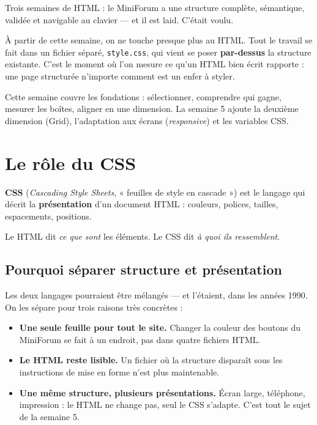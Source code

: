 \documentclass[a4paper,11pt]{article}
\begin{document}
\vspace{4pt}
\begin{tcolorbox}[astuce, title={Où en sommes-nous ?}]
Trois semaines de HTML : le MiniForum a une structure complète, sémantique, validée et navigable au clavier --- et il est laid. C'était voulu.

\vspace{3pt}
À partir de cette semaine, on ne touche presque plus au HTML. Tout le travail se fait dans un fichier séparé, \texttt{style.css}, qui vient se poser \textbf{par-dessus} la structure existante. C'est le moment où l'on mesure ce qu'un HTML bien écrit rapporte : une page structurée n'importe comment est un enfer à styler.

\vspace{3pt}
Cette semaine couvre les fondations : sélectionner, comprendre qui gagne, mesurer les boîtes, aligner en une dimension. La semaine 5 ajoute la deuxième dimension (Grid), l'adaptation aux écrans (\textit{responsive}) et les variables CSS.
\end{tcolorbox}

\section{Le rôle du CSS}

\begin{tcolorbox}[definition, title={Définition --- CSS}]
\textbf{CSS} (\textit{Cascading Style Sheets}, « feuilles de style en cascade ») est le langage qui décrit la \textbf{présentation} d'un document HTML : couleurs, polices, tailles, espacements, positions.

\vspace{3pt}
Le HTML dit \textit{ce que sont} les éléments. Le CSS dit \textit{à quoi ils ressemblent}.
\end{tcolorbox}

\subsection{Pourquoi séparer structure et présentation}

Les deux langages pourraient être mélangés --- et l'étaient, dans les années 1990. On les sépare pour trois raisons très concrètes :

\begin{itemize}
  \item \textbf{Une seule feuille pour tout le site.} Changer la couleur des boutons du MiniForum se fait à un endroit, pas dans quatre fichiers HTML.
  \item \textbf{Le HTML reste lisible.} Un fichier où la structure disparaît sous les instructions de mise en forme n'est plus maintenable.
  \item \textbf{Une même structure, plusieurs présentations.} Écran large, téléphone, impression : le HTML ne change pas, seul le CSS s'adapte. C'est tout le sujet de la semaine 5.
\end{itemize}
\end{document}
